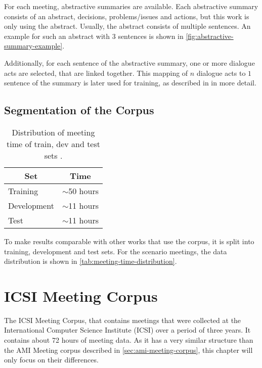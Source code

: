 For each meeting, abstractive summaries are available.
Each abstractive summary consists of an abstract, decisions, problems/issues and actions, but this work is only using the abstract.
Usually, the abstract consists of multiple sentences.
An example for such an abstract with 3 sentences is shown in \autoref{fig:abstractive-summary-example}.

Additionally, for each sentence of the abstractive summary, one or more dialogue acts are selected, that are linked together.
This mapping of $n$ dialogue acts to $1$ sentence of the summary is later used for training, as described in \label{sec:concept-training} in more detail. \cite{amiWebsite}

\subsection{Segmentation of the Corpus}

\begin{table}[h]
\centering
\begin{tabular}{@{}ll@{}}
\toprule
\multicolumn{1}{c}{Set} & \multicolumn{1}{c}{Time} \\ \midrule
Training & $\sim$50 hours \\
Development & $\sim$11 hours \\
Test & $\sim$11 hours \\ \bottomrule
\end{tabular}
\caption[Distribution of meeting time of train, dev and test sets]{Distribution of meeting time of train, dev and test sets \cite{amiWebsite}.}
\label{tab:meeting-time-distribution}
\end{table}

To make results comparable with other works that use the corpus, it is split into training, development and test sets.
For the scenario meetings, the data distribution is shown in \autoref{tab:meeting-time-distribution}. \cite{amiWebsite}


\section{ICSI Meeting Corpus}

The ICSI Meeting Corpus, that contains meetings that were collected at the International Computer Science Institute (ICSI) over a period of three years.
It contains about 72 hours of meeting data. \cite{Janin}
As it has a very similar structure than the AMI Meeting corpus described in \autoref{sec:ami-meeting-corpus}, this chapter will only focus on their differences.

